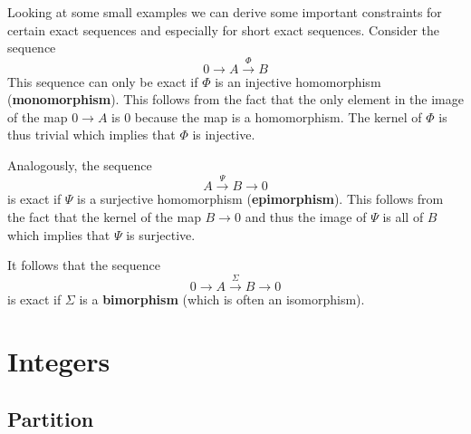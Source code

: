 	
	
	\begin{property}
		Looking at some small examples we can derive some important constraints for certain exact sequences and especially for short exact sequences. Consider the sequence
		\[
			0\rightarrow A\xrightarrow{\Phi} B
		\]
		This sequence can only be exact if $\Phi$ is an injective homomorphism (\textbf{monomorphism}). This follows from the fact that the only element in the image of the map $0\rightarrow A$ is 0 because the map is a homomorphism. The kernel of $\Phi$ is thus trivial which implies that $\Phi$ is injective.
		
		Analogously, the sequence
		\[
			A\xrightarrow{\Psi}B\rightarrow0
		\]
		is exact if $\Psi$ is a surjective homomorphism (\textbf{epimorphism}). This follows from the fact that the kernel of the map $B\rightarrow0$ and thus the image of $\Psi$ is all of $B$ which implies that $\Psi$ is surjective.
		
		It follows that the sequence
		\[
			0\rightarrow A\xrightarrow{\Sigma}B\rightarrow0
		\]
		is exact if $\Sigma$ is a \textbf{bimorphism} (which is often an isomorphism).
	\end{property}

\section{Integers}
\subsection{Partition}
	

